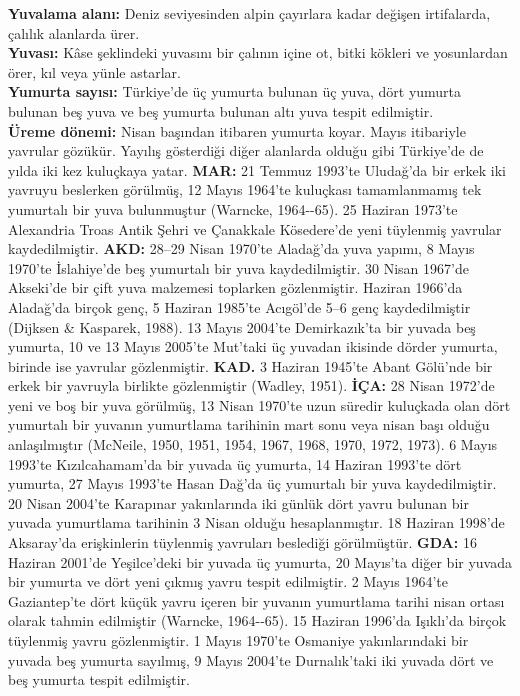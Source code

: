 \documentclass[
  10.5pt,
  a4paper,
  DIV=11,
  numbers=noendperiod,
  twocolumn]{scrreprt}
\begin{document}
\textbf{Yuvalama alanı:} Deniz seviyesinden alpin çayırlara kadar
değişen irtifalarda, çalılık alanlarda ürer.\\
\textbf{Yuvası:} Kâse şeklindeki yuvasını bir çalının içine ot, bitki
kökleri ve yosunlardan örer, kıl veya yünle astarlar.\\
\textbf{Yumurta sayısı:} Türkiye'de üç yumurta bulunan üç yuva, dört
yumurta bulunan beş yuva ve beş yumurta bulunan altı yuva tespit
edilmiştir.\\
\textbf{Üreme dönemi:} Nisan başından itibaren yumurta koyar. Mayıs
itibariyle yavrular gözükür. Yayılış gösterdiği diğer alanlarda olduğu
gibi Türkiye'de de yılda iki kez kuluçkaya yatar. \textbf{MAR:} 21
Temmuz 1993'te Uludağ'da bir erkek iki yavruyu beslerken görülmüş, 12
Mayıs 1964'te kuluçkası tamamlanmamış tek yumurtalı bir yuva bulunmuştur
(Warncke, 1964-\/-65). 25 Haziran 1973'te Alexandria Troas Antik Şehri
ve Çanakkale Kösedere'de yeni tüylenmiş yavrular kaydedilmiştir.
\textbf{AKD:} 28--29 Nisan 1970'te Aladağ'da yuva yapımı, 8 Mayıs
1970'te İslahiye'de beş yumurtalı bir yuva kaydedilmiştir. 30 Nisan
1967'de Akseki'de bir çift yuva malzemesi toplarken gözlenmiştir.
Haziran 1966'da Aladağ'da birçok genç, 5 Haziran 1985'te Acıgöl'de 5--6
genç kaydedilmiştir (Dijksen \& Kasparek, 1988). 13 Mayıs 2004'te
Demirkazık'ta bir yuvada beş yumurta, 10 ve 13 Mayıs 2005'te Mut'taki üç
yuvadan ikisinde dörder yumurta, birinde ise yavrular gözlenmiştir.
\textbf{KAD.} 3 Haziran 1945'te Abant Gölü'nde bir erkek bir yavruyla
birlikte gözlenmiştir (Wadley, 1951). \textbf{İÇA:} 28 Nisan 1972'de
yeni ve boş bir yuva görülmüş, 13 Nisan 1970'te uzun süredir kuluçkada
olan dört yumurtalı bir yuvanın yumurtlama tarihinin mart sonu veya
nisan başı olduğu anlaşılmıştır (McNeile, 1950, 1951, 1954, 1967, 1968,
1970, 1972, 1973). 6 Mayıs 1993'te Kızılcahamam'da bir yuvada üç
yumurta, 14 Haziran 1993'te dört yumurta, 27 Mayıs 1993'te Hasan Dağ'da
üç yumurtalı bir yuva kaydedilmiştir. 20 Nisan 2004'te Karapınar
yakınlarında iki günlük dört yavru bulunan bir yuvada yumurtlama
tarihinin 3 Nisan olduğu hesaplanmıştır. 18 Haziran 1998'de Aksaray'da
erişkinlerin tüylenmiş yavruları beslediği görülmüştür. \textbf{GDA:} 16
Haziran 2001'de Yeşilce'deki bir yuvada üç yumurta, 20 Mayıs'ta diğer
bir yuvada bir yumurta ve dört yeni çıkmış yavru tespit edilmiştir. 2
Mayıs 1964'te Gaziantep'te dört küçük yavru içeren bir yuvanın
yumurtlama tarihi nisan ortası olarak tahmin edilmiştir (Warncke,
1964-\/-65). 15 Haziran 1996'da Işıklı'da birçok tüylenmiş yavru
gözlenmiştir. 1 Mayıs 1970'te Osmaniye yakınlarındaki bir yuvada beş
yumurta sayılmış, 9 Mayıs 2004'te Durnalık'taki iki yuvada dört ve beş
yumurta tespit edilmiştir.
\end{document}
